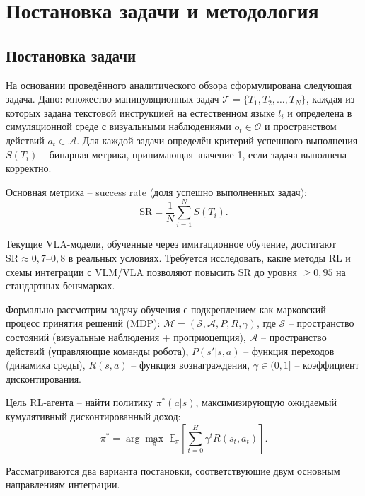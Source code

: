\chapter{Постановка задачи и методология}
\label{ch:chap2}

\section{Постановка задачи}
\label{sec:problem}

    На основании проведённого аналитического обзора сформулирована следующая задача. Дано: множество манипуляционных задач $\mathcal{T} = \{T_1, T_2, \ldots, T_N\}$, каждая из которых задана текстовой инструкцией на естественном языке $l_i$ и определена в симуляционной среде с визуальными наблюдениями $o_t \in \mathcal{O}$ и пространством действий $a_t \in \mathcal{A}$. Для каждой задачи определён критерий успешного выполнения $S(T_i)$ -- бинарная метрика, принимающая значение 1, если задача выполнена корректно.

    Основная метрика -- success rate (доля успешно выполненных задач):
\begin{equation}
\label{eq:success_rate}
    \text{SR} = \frac{1}{N} \sum_{i=1}^{N} S(T_i).
\end{equation}

    Текущие VLA-модели, обученные через имитационное обучение, достигают $\text{SR} \approx 0{,}7$--$0{,}8$ в реальных условиях. Требуется исследовать, какие методы RL и схемы интеграции с VLM/VLA позволяют повысить SR до уровня $\geq 0{,}95$ на стандартных бенчмарках.

    Формально рассмотрим задачу обучения с подкреплением как марковский процесс принятия решений (MDP): $\mathcal{M} = (\mathcal{S}, \mathcal{A}, P, R, \gamma)$, где $\mathcal{S}$ -- пространство состояний (визуальные наблюдения + проприоцепция), $\mathcal{A}$ -- пространство действий (управляющие команды робота), $P(s'|s, a)$ -- функция переходов (динамика среды), $R(s, a)$ -- функция вознаграждения, $\gamma \in (0, 1]$ -- коэффициент дисконтирования.

    Цель RL-агента -- найти политику $\pi^*(a|s)$, максимизирующую ожидаемый кумулятивный дисконтированный доход:
\begin{equation}
\label{eq:rl_objective}
    \pi^* = \arg\max_\pi \; \mathbb{E}_\pi \left[ \sum_{t=0}^{H} \gamma^t R(s_t, a_t) \right].
\end{equation}

    Рассматриваются два варианта постановки, соответствующие двум основным направлениям интеграции.

